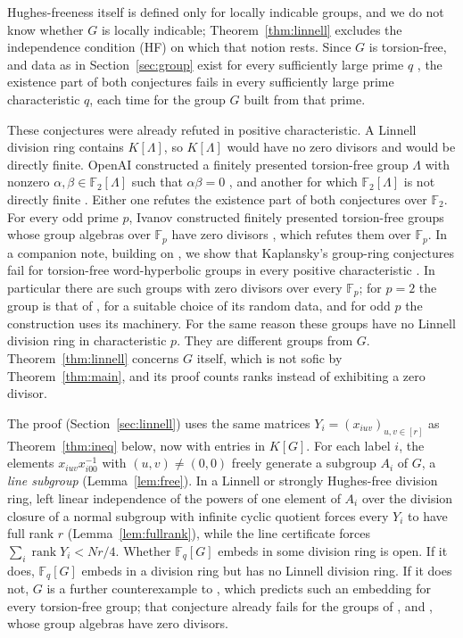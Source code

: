 \documentclass[11pt]{article}
\theoremstyle{definition}
\theoremstyle{remark}
\numberwithin{equation}{section}
\DeclareMathOperator{\rank}{rank}
\newcommand{\F}{\mathbb F}
\begin{document}
Hughes-freeness itself is defined only for locally indicable groups, and we do not know whether $G$ is locally indicable; Theorem~\ref{thm:linnell} excludes the independence condition (HF) on which that notion rests. Since $G$ is torsion-free, and data as in Section~\ref{sec:group} exist for every sufficiently large prime $q$ \cite[Lemma~2.2]{OAI252}, the existence part of both conjectures fails in every sufficiently large prime characteristic $q$, each time for the group $G$ built from that prime.

These conjectures were already refuted in positive characteristic. A Linnell division ring contains $K[\Lambda]$, so $K[\Lambda]$ would have no zero divisors and would be directly finite. OpenAI constructed a finitely presented torsion-free group $\Lambda$ with nonzero $\alpha,\beta\in\F_2[\Lambda]$ such that $\alpha\beta=0$ \cite[Theorem~1.1]{OAI196}, and another for which $\F_2[\Lambda]$ is not directly finite \cite[Theorem~1.1]{OAI197}. Either one refutes the existence part of both conjectures over $\F_2$. For every odd prime $p$, Ivanov constructed finitely presented torsion-free groups whose group algebras over $\F_p$ have zero divisors \cite[Theorem~1.1]{Ivanov2026}, which refutes them over $\F_p$. In a companion note, building on \cite{OAI196,OAI197}, we show that Kaplansky's group-ring conjectures fail for torsion-free word-hyperbolic groups in every positive characteristic \cite{DMzd}. In particular there are such groups with zero divisors over every $\F_p$; for $p=2$ the group is that of \cite{OAI196}, for a suitable choice of its random data, and for odd $p$ the construction uses its machinery. For the same reason these groups have no Linnell division ring in characteristic $p$. They are different groups from $G$. Theorem~\ref{thm:linnell} concerns $G$ itself, which is not sofic by Theorem~\ref{thm:main}, and its proof counts ranks instead of exhibiting a zero divisor.

The proof (Section~\ref{sec:linnell}) uses the same matrices $Y_i=(x_{iuv})_{u,v\in[r]}$ as Theorem~\ref{thm:ineq} below, now with entries in $K[G]$. For each label $i$, the elements $x_{iuv}x_{i00}^{-1}$ with $(u,v)\ne(0,0)$ freely generate a subgroup $A_i$ of $G$, a \emph{line subgroup} (Lemma~\ref{lem:free}). In a Linnell or strongly Hughes-free division ring, left linear independence of the powers of one element of $A_i$ over the division closure of a normal subgroup with infinite cyclic quotient forces every $Y_i$ to have full rank $r$ (Lemma~\ref{lem:fullrank}), while the line certificate forces $\sum_i\rank Y_i<Nr/4$. Whether $\F_q[G]$ embeds in some division ring is open. If it does, $\F_q[G]$ embeds in a division ring but has no Linnell division ring. If it does not, $G$ is a further counterexample to \cite[Conjecture~1.1]{FSP2026}, which predicts such an embedding for every torsion-free group; that conjecture already fails for the groups of \cite{OAI196}, \cite{Ivanov2026} and \cite{DMzd}, whose group algebras have zero divisors.
\end{document}
